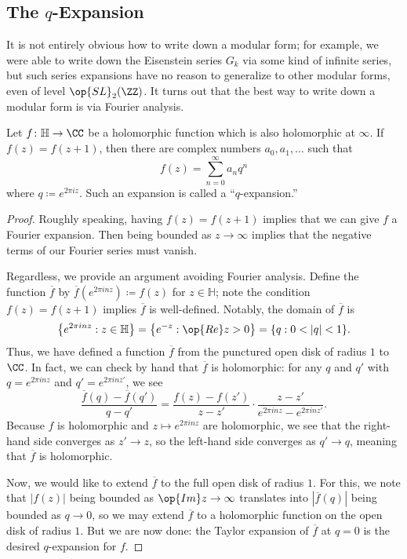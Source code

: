 \documentclass{amsart}
\begin{document}
\subsection{The \texorpdfstring{$q$}{q}-Expansion}
It is not entirely obvious how to write down a modular form; for example, we were able to write down the Eisenstein series $G_k$ via some kind of infinite series, but such series expansions have no reason to generalize to other modular forms, even of level $\op{SL}_2(\ZZ)$. It turns out that the best way to write down a modular form is via Fourier analysis.
\begin{proposition}[{$q$-expansion}] \label{prop:q-expansion}
	Let $f\colon\mathbb H\to\CC$ be a holomorphic function which is also holomorphic at $\infty$. If $f(z)=f(z+1)$, then there are complex numbers $a_0,a_1,\ldots$ such that
	\[f(z)=\sum_{n=0}^\infty a_nq^n\]
	where $q\coloneqq e^{2\pi iz}$. Such an expansion is called a ``$q$-expansion.''
\end{proposition}
\begin{proof}
	Roughly speaking, having $f(z)=f(z+1)$ implies that we can give $f$ a Fourier expansion. Then being bounded as $z\to\infty$ implies that the negative terms of our Fourier series must vanish.

	Regardless, we provide an argument avoiding Fourier analysis. Define the function $\overline f$ by $\overline f\left(e^{2\pi inz}\right)\coloneqq f(z)$ for $z\in\mathbb H$; note the condition $f(z)=f(z+1)$ implies $\overline f$ is well-defined. Notably, the domain of $\overline f$ is
	\[\left\{e^{2\pi inz}:z\in\mathbb H\right\}=\left\{e^{-z}:\op{Re}z>0\right\}=\{q:0<|q|<1\}.\]
	Thus, we have defined a function $\overline f$ from the punctured open disk of radius $1$ to $\CC$. In fact, we can check by hand that $\overline f$ is holomorphic: for any $q$ and $q'$ with $q=e^{2\pi inz}$ and $q'=e^{2\pi inz'}$, we see
	\[\frac{\overline f(q)-\overline f(q')}{q-q'}=\frac{f(z)-f(z')}{z-z'}\cdot\frac{z-z'}{e^{2\pi inz}-e^{2\pi inz'}}.\]
	Because $f$ is holomorphic and $z\mapsto e^{2\pi inz}$ are holomorphic, we see that the right-hand side converges as $z'\to z$, so the left-hand side converges as $q'\to q$, meaning that $\overline f$ is holomorphic.

	Now, we would like to extend $\overline f$ to the full open disk of radius $1$. For this, we note that $|f(z)|$ being bounded as $\op{Im}z\to\infty$ translates into $|\overline f(q)|$ being bounded as $q\to0$, so we may extend $\overline f$ to a holomorphic function on the open disk of radius $1$. But we are now done: the Taylor expansion of $\overline f$ at $q=0$ is the desired $q$-expansion for $f$.
\end{proof}
\end{document}
